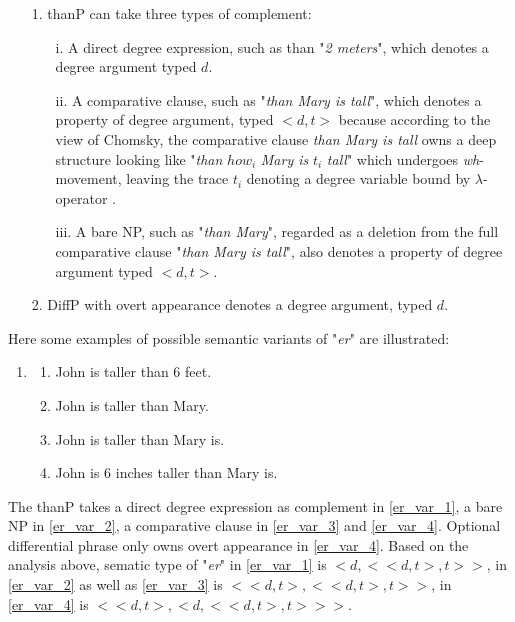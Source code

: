 \documentclass{ctexart}
\let \cite \parencite
\begin{document}
\begin{itemize}
\item[1.]
thanP can take three types of complement:

\begin{itemize}
\item[i.]
A direct degree expression, such as than "\textit{2 meters}", which denotes a degree argument typed $d$.
\item[ii.]
A comparative clause, such as "\textit{than Mary is tall}", which denotes a property of degree argument, typed $<d,t>$ because according to the view of Chomsky, the comparative clause \textit{than Mary is tall} owns a deep structure looking like "\textit{than} $how_i$ \textit{Mary is} $t_i$ \textit{tall}" which undergoes \textit{wh}-movement, leaving the trace $t_i$ denoting a degree variable bound by $\lambda$-operator \cite{chomsky1977}.
\item[iii.]
A bare NP, such as "\textit{than Mary}", regarded as a deletion from the full comparative clause "\textit{than Mary is tall}", also denotes a property of degree argument typed $<d,t>$.
\end{itemize}

\item[2.]
DiffP with overt appearance denotes a degree argument, typed $d$.

\end{itemize}

Here some examples of possible semantic variants of "\textit{er}" are illustrated:

\begin{enumerate}[resume]
    \item
    \begin{enumerate}[ref=(\arabic{enumi}\alph*)]
        \item \label{er_var_1} John is taller than 6 feet.
        \item \label{er_var_2} John is taller than Mary.
        \item \label{er_var_3} John is taller than Mary is.
        \item \label{er_var_4} John is 6 inches taller than Mary is.
    \end{enumerate}

\end{enumerate}

The thanP takes a direct degree expression as complement in \ref{er_var_1}, a bare NP in \ref{er_var_2}, a comparative clause in \ref{er_var_3} and \ref{er_var_4}. Optional differential phrase only owns overt appearance in \ref{er_var_4}. Based on the analysis above, sematic type of "\textit{er}" in \ref{er_var_1} is $<d,<<d,t>,t>>$, in \ref{er_var_2} as well as \ref{er_var_3} is $<<d,t>,<<d,t>,t>>$, in \ref{er_var_4} is $<<d,t>,<d,<<d,t>,t>>>$.
\end{document}

